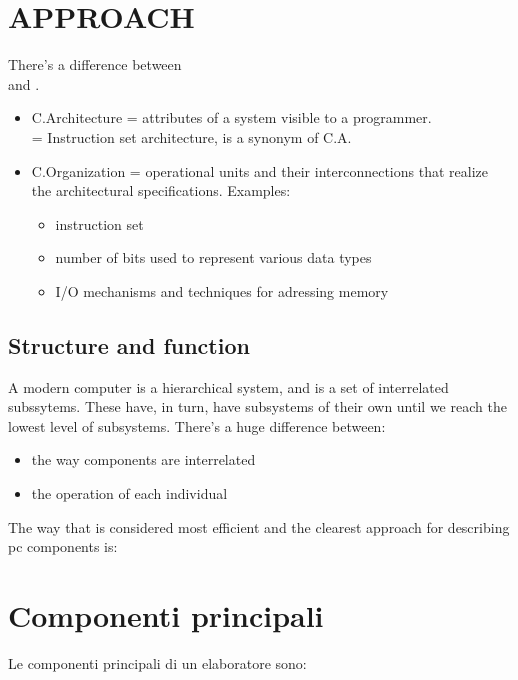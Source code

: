 \documentclass[12pt, a4paper]{article}
\begin{document}




\section{APPROACH}
There's a difference between \\
 and 
.

\begin{itemize}
	\item C.Architecture = attributes of a system visible to a programmer. \\
		 = Instruction set architecture, is a synonym of C.A.
	\item C.Organization = operational units and their interconnections 
		that realize the architectural specifications. Examples:
		\begin{itemize}
		\item instruction set
		\item number of bits used to represent various data types
		\item I/O mechanisms and techniques for adressing memory
		\end{itemize}
\end{itemize} 

\subsection{Structure and function}
A modern computer is a hierarchical system, and is a set of interrelated subssytems.
These have, in turn, have subsystems of their own until we reach the lowest level
of subsystems.
There's a huge difference between:

\begin{itemize}
	\item {} the way components are interrelated
	\item {} the operation of each individual 
\end{itemize}
The way that is considered most efficient and the clearest approach
for describing pc components is:

\section{ Componenti principali}
Le componenti principali di un elaboratore sono:
\end{document}
